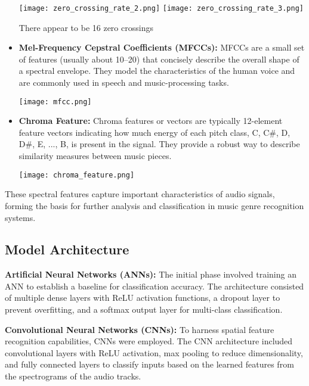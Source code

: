 \documentclass[lettersize,journal]{IEEEtran}
\begin{document}
\begin{itemize}
\begin{center}
    \texttt{[image: zero\_crossing\_rate\_2.png]}
    \texttt{[image: zero\_crossing\_rate\_3.png]}
    \end{center}
    There appear to be 16 zero crossings
    \vspace{\baselineskip}


    \item \textbf{Mel-Frequency Cepstral Coefficients (MFCCs):} MFCCs are a small set of features (usually about 10–20) that concisely describe the overall shape of a spectral envelope. They model the characteristics of the human voice and are commonly used in speech and music-processing tasks.
    \begin{center}
    \texttt{[image: mfcc.png]}
    \end{center}

    \item \textbf{Chroma Feature:} Chroma features or vectors are typically 12-element feature vectors indicating how much energy of each pitch class, {C, C\#, D, D\#, E, ..., B}, is present in the signal. They provide a robust way to describe similarity measures between music pieces.
    \begin{center}
    \texttt{[image: chroma\_feature.png]}
    \end{center}
\end{itemize}

These spectral features capture important characteristics of audio signals, forming the basis for further analysis and classification in music genre recognition systems.

\subsection{Model Architecture}
\textbf{Artificial Neural Networks (ANNs):} The initial phase involved training an ANN to establish a baseline for classification accuracy. The architecture consisted of multiple dense layers with ReLU activation functions, a dropout layer to prevent overfitting, and a softmax output layer for multi-class classification.

\textbf{Convolutional Neural Networks (CNNs):} To harness spatial feature recognition capabilities, CNNs were employed. The CNN architecture included convolutional layers with ReLU activation, max pooling to reduce dimensionality, and fully connected layers to classify inputs based on the learned features from the spectrograms of the audio tracks.
\end{document}
